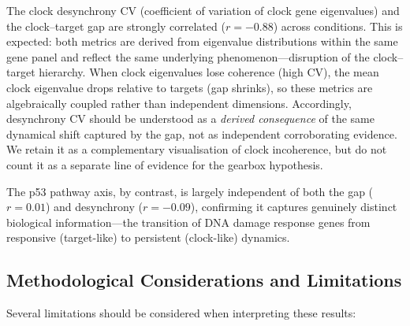\documentclass[11pt,a4paper]{article}
\begin{document}
The clock desynchrony CV (coefficient of variation of clock gene eigenvalues) and the clock--target gap are strongly correlated ($r = -0.88$) across conditions. This is expected: both metrics are derived from eigenvalue distributions within the same gene panel and reflect the same underlying phenomenon---disruption of the clock--target hierarchy. When clock eigenvalues lose coherence (high CV), the mean clock eigenvalue drops relative to targets (gap shrinks), so these metrics are algebraically coupled rather than independent dimensions. Accordingly, desynchrony CV should be understood as a \textit{derived consequence} of the same dynamical shift captured by the gap, not as independent corroborating evidence. We retain it as a complementary visualisation of clock incoherence, but do not count it as a separate line of evidence for the gearbox hypothesis.

The p53 pathway axis, by contrast, is largely independent of both the gap ($r = 0.01$) and desynchrony ($r = -0.09$), confirming it captures genuinely distinct biological information---the transition of DNA damage response genes from responsive (target-like) to persistent (clock-like) dynamics.

\subsection{Methodological Considerations and Limitations}

Several limitations should be considered when interpreting these results:
\end{document}
